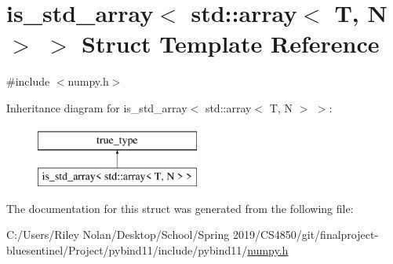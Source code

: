 \hypertarget{structis__std__array_3_01std_1_1array_3_01_t_00_01_n_01_4_01_4}{}\section{is\+\_\+std\+\_\+array$<$ std\+::array$<$ T, N $>$ $>$ Struct Template Reference}
\label{structis__std__array_3_01std_1_1array_3_01_t_00_01_n_01_4_01_4}


{\ttfamily \#include $<$numpy.\+h$>$}

Inheritance diagram for is\+\_\+std\+\_\+array$<$ std\+::array$<$ T, N $>$ $>$\+:\begin{figure}[H]
\begin{center}
\leavevmode
\includegraphics[height=2.000000cm]{structis__std__array_3_01std_1_1array_3_01_t_00_01_n_01_4_01_4}
\end{center}
\end{figure}


The documentation for this struct was generated from the following file\+:\begin{DoxyCompactItemize}
\item 
C\+:/\+Users/\+Riley Nolan/\+Desktop/\+School/\+Spring 2019/\+C\+S4850/git/finalproject-\/bluesentinel/\+Project/pybind11/include/pybind11/\mbox{\hyperlink{numpy_8h}{numpy.\+h}}\end{DoxyCompactItemize}
